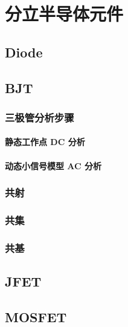 \chapter{分立半导体元件}

\section{Diode}
\section{BJT}

\subsection{三极管分析步骤}

\subsubsection{静态工作点 DC 分析}

\subsubsection{动态小信号模型 AC 分析}

\subsection{共射}

\subsection{共集}

\subsection{共基}

\section{JFET}

\section{MOSFET}


